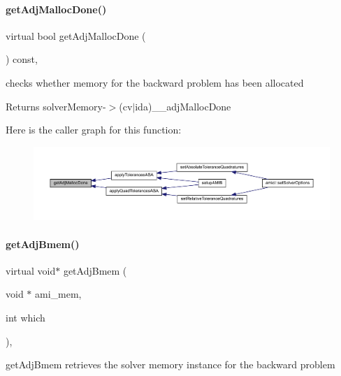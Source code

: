 \paragraph{\texorpdfstring{get\+Adj\+Malloc\+Done()}{getAdjMallocDone()}}
{\footnotesize\ttfamily virtual bool get\+Adj\+Malloc\+Done (\begin{DoxyParamCaption}{ }\end{DoxyParamCaption}) const\hspace{0.3cm}{\ttfamily [protected]}, {}}

checks whether memory for the backward problem has been allocated

\begin{DoxyReturn}{Returns}
solver\+Memory-\/$>$(cv$\vert$ida)\+\_\+\+\_\+adj\+Malloc\+Done 
\end{DoxyReturn}
Here is the caller graph for this function\+:
\nopagebreak
\begin{figure}[H]
\begin{center}
\leavevmode
\includegraphics[width=350pt]{classamici_1_1_solver_a9673b3bc9248c4b7a156da9632b91436_icgraph}
\end{center}
\end{figure}
\mbox{\label{classamici_1_1_solver_a96a36300db9c200d9586c2b90ced4195}} 
\paragraph{\texorpdfstring{get\+Adj\+Bmem()}{getAdjBmem()}}
{\footnotesize\ttfamily virtual void$\ast$ get\+Adj\+Bmem (\begin{DoxyParamCaption}\item[{void $\ast$}]{ami\+\_\+mem,  }\item[{int}]{which }\end{DoxyParamCaption})\hspace{0.3cm}{\ttfamily [protected]}, {}}

get\+Adj\+Bmem retrieves the solver memory instance for the backward problem


